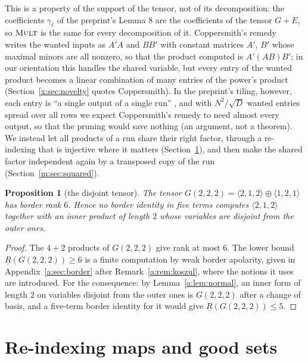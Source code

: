 \documentclass[11pt]{article}
\newtheorem{proposition}[theorem]{Proposition}
\theoremstyle{definition}
\theoremstyle{remark}
\newcommand{\Mult}{\textnormal{\textsc{Mult}}}
\begin{document}
This is a property of the support of the tensor, not of its decomposition: the coefficients $\gamma_\ell$ of the preprint's Lemma 8 are the coefficients of the tensor $G+E$, so $\Mult$ is the same for every decomposition of it. Coppersmith's remedy~\cite[p.~468]{Cop82} writes the wanted inputs as $A'A$ and $BB'$ with constant matrices $A'$, $B'$ whose maximal minors are all nonzero, so that the product computed is $A'(AB)B'$; in our orientation this handles the shared variable, but every entry of the wanted product becomes a linear combination of many entries of the power's product (Section~\ref{x:sec:novelty} quotes Coppersmith). In the preprint's tiling, however, each entry is ``a single output of a single run'' \cite[Section 2.3.4]{ZT}, and with $N^2/\sqrt D$ wanted entries spread over all rows we expect Coppersmith's remedy to need almost every output, so that the pruning would save nothing (an argument, not a theorem). We instead let all products of a run share their right factor, through a re-indexing that is injective where it matters (Section~\ref{m:sec:hash}), and then make the shared factor independent again by a transposed copy of the run (Section~\ref{m:sec:squared}).

\begin{proposition}[the disjoint tensor]\label{m:rem:border}
The tensor $G(2,2,2)=\langle2,1,2\rangle\oplus\langle1,2,1\rangle$ has border rank $6$. Hence no border identity in five terms computes $\langle2,1,2\rangle$ together with an inner product of length $2$ whose variables are disjoint from the outer ones.
\end{proposition}

\begin{proof}
The $4+2$ products of $G(2,2,2)$ give rank at most $6$. The lower bound $\underline R(G(2,2,2))\ge6$ is a finite computation by weak border apolarity, given in Appendix~\ref{a:sec:border} after Remark~\ref{a:rem:koszul}, where the notions it uses are introduced. For the consequence: by Lemma~\ref{a:lem:normal}, an inner form of length $2$ on variables disjoint from the outer ones is $G(2,2,2)$ after a change of basis, and a five-term border identity for it would give $\underline R(G(2,2,2))\le5$.
\end{proof}

\section{Re-indexing maps and good sets}\label{m:sec:hash}
\end{document}

